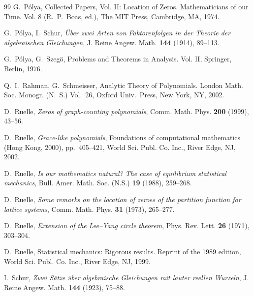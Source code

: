 \documentclass[10pt,reqno]{amsart}
\theoremstyle{plain}
\theoremstyle{definition}
\theoremstyle{remark}
\numberwithin{equation}{section}
\begin{document}
\begin{thebibliography}{99}
G.~P\'olya, Collected Papers, Vol. II: Location of Zeros. Mathematicians of 
our Time. Vol. 8 (R.~P.~Boas, ed.), The MIT Press, Cambridge, MA, 1974.

G.~P\'olya, I.~Schur, {\em \"Uber zwei Arten von
Faktorenfolgen in der Theorie der algebraischen Gleichungen}, J. Reine
Angew. Math. {\bf 144} (1914), 89--113.

G.~P\'olya, G.~Szeg\"o, Problems and Theorems in Analysis. 
Vol. II, Springer, Berlin, 1976.

Q.~I.~Rahman, G.~Schmeisser, Analytic Theory of Polynomials. London
Math. Soc. Monogr. (N.~S.) Vol.~26, Oxford Univ.~Press, New York,
NY, 2002.




D.~Ruelle, {\em Zeros of graph-counting polynomials}, Comm. Math. Phys.
{\bf 200} (1999), 43--56.

D.~Ruelle, {\em Grace-like polynomials}, Foundations of computational 
mathematics (Hong Kong, 2000), pp.~405--421, World Sci. Publ. Co. Inc., 
River Edge, NJ, 2002.

D.~Ruelle, {\em Is our mathematics natural? The case of equilibrium 
statistical mechanics}, Bull. Amer. Math. Soc. (N.S.) {\bf 19} (1988), 
259--268. 

D.~Ruelle, {\em Some remarks on the location of zeroes of the partition 
function for lattice systems}, Comm. Math. Phys. {\bf 31} (1973), 265--277.

D.~Ruelle, {\em Extension of the Lee--Yang circle theorem}, 
Phys. Rev. Lett. {\bf 26} (1971), 303--304.

D.~Ruelle, Statistical mechanics: Rigorous results. Reprint of the 1989 
edition, World Sci. Publ. Co. Inc., River Edge, NJ, 1999.

I.~Schur,
{\em  Zwei S\"atze \"uber algebraische Gleichungen mit lauter reellen 
Wurzeln}, J. Reine Angew. Math. {\bf 144} (1923), 75--88.


\end{thebibliography}
\end{document}
